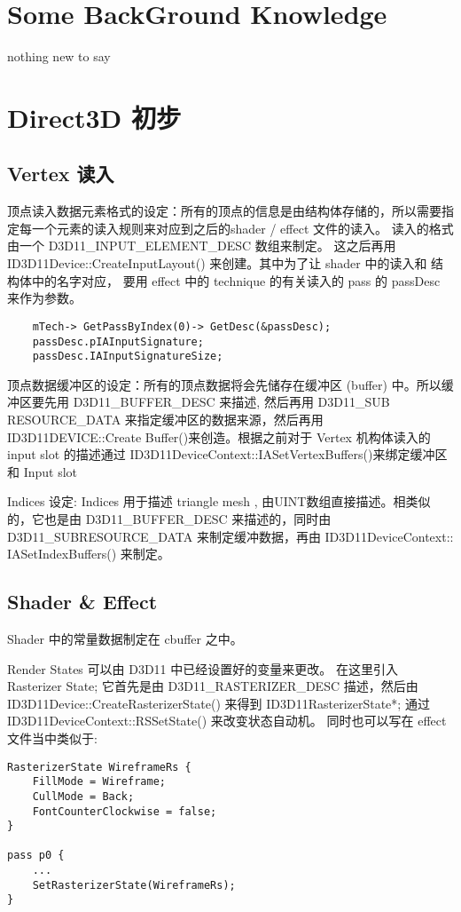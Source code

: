 \documentclass[10pt, a4paper]{article}
\begin{document}
\section{Some BackGround Knowledge}
    nothing new to say 

\newpage

\section{Direct3D 初步}
    \subsection{Vertex 读入} 
    顶点读入数据元素格式的设定：所有的顶点的信息是由结构体存储的，所以需要指定每一个元素的读入规则来对应到之后的shader / effect 文件的读入。 读入的格式由一个 D3D11\_INPUT\_ELEMENT\_DESC 数组来制定。 这之后再用 ID3D11Device::CreateInputLayout() 来创建。其中为了让 shader 中的读入和 结构体中的名字对应， 要用 effect 中的 technique 的有关读入的 pass 的 passDesc 来作为参数。

\begin{lstlisting}
    mTech-> GetPassByIndex(0)-> GetDesc(&passDesc);
    passDesc.pIAInputSignature; 
    passDesc.IAInputSignatureSize;
\end{lstlisting}

    顶点数据缓冲区的设定：所有的顶点数据将会先储存在缓冲区 (buffer) 中。所以缓冲区要先用 D3D11\_BUFFER\_DESC 来描述, 然后再用 D3D11\_SUB RESOURCE\_DATA 来指定缓冲区的数据来源，然后再用ID3D11DEVICE::Create Buffer()来创造。根据之前对于 Vertex 机构体读入的 input slot 的描述通过 ID3D11DeviceContext::IASetVertexBuffers()来绑定缓冲区和 Input slot

    Indices 设定: Indices 用于描述 triangle mesh , 由UINT数组直接描述。相类似的，它也是由 D3D11\_BUFFER\_DESC 来描述的，同时由 D3D11\_SUBRESOURCE\_DATA 来制定缓冲数据，再由 ID3D11DeviceContext:: IASetIndexBuffers() 来制定。

    \subsection{Shader \& Effect}
    Shader 中的常量数据制定在 cbuffer 之中。

    Render States 可以由 D3D11 中已经设置好的变量来更改。 在这里引入 Rasterizer State; 它首先是由 D3D11\_RASTERIZER\_DESC 描述，然后由 ID3D11Device::CreateRasterizerState() 来得到 ID3D11RasterizerState*; 通过 ID3D11DeviceContext::RSSetState() 来改变状态自动机。 同时也可以写在 effect 文件当中类似于:
\begin{lstlisting}
RasterizerState WireframeRs {
    FillMode = Wireframe;
    CullMode = Back; 
    FontCounterClockwise = false;
}

pass p0 {
    ...
    SetRasterizerState(WireframeRs);
}
\end{lstlisting}
\end{document}
